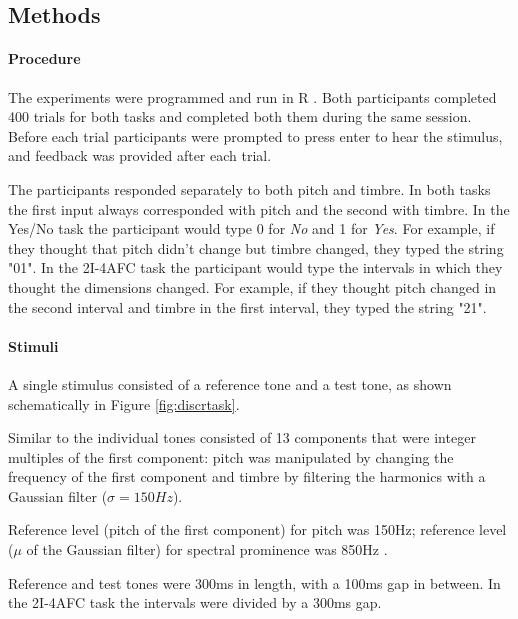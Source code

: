 \documentclass{article}\usepackage{knitr}
\begin{document}
\subsection{Methods}

\paragraph{Procedure}

The experiments were programmed and run in R \citep{r_language}. Both participants completed 400 trials for both tasks and completed both them during the same session.  Before each trial participants were prompted to press enter to hear the stimulus, and feedback was provided after each trial.

The participants responded separately to both pitch and timbre. In both tasks the first input always corresponded with pitch and the second with timbre. In the Yes/No task the participant would type 0 for \textit{No} and 1 for \textit{Yes}. For example, if they thought that pitch didn't change but timbre changed, they typed the string "01". In the 2I-4AFC task the participant would type the intervals in which they thought the dimensions changed. For example, if they thought pitch changed in the second interval and timbre in the first interval, they typed the string "21". 

\paragraph{Stimuli}

A single stimulus consisted of a reference tone and a test tone, as shown schematically in Figure \ref{fig:discrtask}. 

Similar to \citet{silbert2009} the individual tones consisted of 13 components that were integer multiples of the first component: pitch was manipulated by changing the frequency of the first component and timbre by filtering the harmonics with a Gaussian filter ($\sigma = 150Hz$).

Reference level (pitch of the first component) for pitch was 150Hz; reference level ($\mu$ of the Gaussian filter) for spectral prominence was 850Hz .

Reference and test tones were 300ms in length, with a 100ms gap in between. In the 2I-4AFC task the intervals were divided by a 300ms gap.
\end{document}
